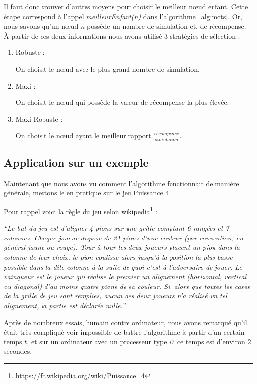 \documentclass[pdftex,french, english]{article}	%
\begin{document}
Il faut donc trouver d'autres moyens pour choisir le meilleur nœud enfant. 
Cette étape correspond à l'appel \textit{meilleurEnfant(n)} dans l'algorithme~\ref{alg:mcts}. 
Or, nous savons qu'un nœud $n$ possède un nombre de simulation et, de récompense.
	À partir de ces deux informations nous avons utilisé 3 stratégies de sélection :
	\begin{enumerate}
		\item Robuste :
		
		On choisit le nœud avec le plus grand nombre de simulation.
		\item Maxi :  
		
		On choisit le nœud qui possède la valeur de récompense la plus élevée.
		\item Maxi-Robuste :
		
		On choisit le nœud ayant le meilleur rapport $\frac{recompense}{simulation}$.
	\end{enumerate}
    
    
    
    
    
	\subsection{Application sur un exemple}
	Maintenant que nous avons vu comment l'algorithme fonctionnait de manière générale, mettons le en pratique sur le jeu Puissance $4$. 
    

    Pour rappel voici la règle du jeu selon wikipedia\footnote{\url{https://fr.wikipedia.org/wiki/Puissance_4}} :
   
    \begin{displayquote}
    \textit{``Le but du jeu est d'aligner 4 pions sur une grille comptant 6 rangées et 7 colonnes. Chaque joueur dispose de 21 pions d'une couleur (par convention, en général jaune ou rouge). Tour à tour les deux joueurs placent un pion dans la colonne de leur choix, le pion coulisse alors jusqu'à la position la plus basse possible dans la dite colonne à la suite de quoi c'est à l'adversaire de jouer. Le vainqueur est le joueur qui réalise le premier un alignement (horizontal, vertical ou diagonal) d'au moins quatre pions de sa couleur. Si, alors que toutes les cases de la grille de jeu sont remplies, aucun des deux joueurs n'a réalisé un tel alignement, la partie est déclarée nulle.''}
   	\end{displayquote}


	Après de nombreux essais, humain contre ordinateur, nous avons remarqué qu'il était très compliqué voir impossible de battre l'algorithme à partir d'un certain temps $t$, et sur un ordinateur avec un processeur type $i7$ ce temps est d'environ $2$ secondes.
	
\end{document}
